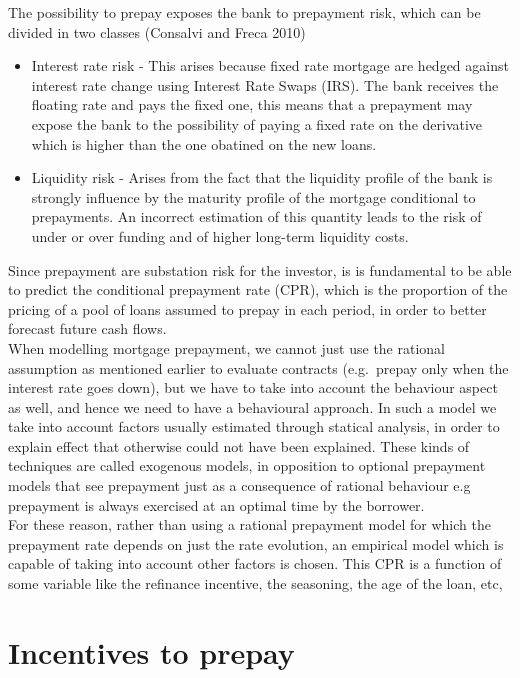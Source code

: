 \documentclass[12pt,twoside]{reedthesis}
\begin{document}
The possibility to prepay exposes the bank to prepayment risk, which can be divided in two classes (Consalvi and Freca 2010)
\begin{itemize}
\item
  Interest rate risk - This arises because fixed rate mortgage are hedged against interest rate change using Interest Rate Swaps (IRS). The bank receives the floating rate and pays the fixed one, this means that a prepayment may expose the bank to the possibility of paying a fixed rate on the derivative which is higher than the one obatined on the new loans.
\item
  Liquidity risk - Arises from the fact that the liquidity profile of the bank is strongly influence by the maturity profile of the mortgage conditional to prepayments. An incorrect estimation of this quantity leads to the risk of under or over funding and of higher long-term liquidity costs.
\end{itemize}
Since prepayment are substation risk for the investor, is is fundamental to be able to predict the conditional prepayment rate (CPR), which is the proportion of the pricing of a pool of loans assumed to prepay in each period, in order to better forecast future cash flows.\\
When modelling mortgage prepayment, we cannot just use the rational assumption as mentioned earlier to evaluate contracts (e.g.~prepay only when the interest rate goes down), but we have to take into account the behaviour aspect as well, and hence we need to have a behavioural approach. In such a model we take into account factors usually estimated through statical analysis, in order to explain effect that otherwise could not have been explained. These kinds of techniques are called exogenous models, in opposition to optional prepayment models that see prepayment just as a consequence of rational behaviour e.g prepayment is always exercised at an optimal time by the borrower.\\
For these reason, rather than using a rational prepayment model for which the prepayment rate depends on just the rate evolution, an empirical model which is capable of taking into account other factors is chosen. This CPR is a function of some variable like the refinance incentive, the seasoning, the age of the loan, etc,

\hypertarget{incentives-to-prepay}{%
\section{Incentives to prepay}\label{incentives-to-prepay}}
\end{document}
